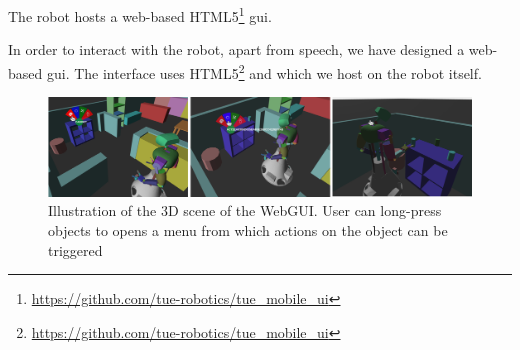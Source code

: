 \label{ssec:webgui}
The robot hosts a web-based HTML5\footnote{\url{https://github.com/tue-robotics/tue_mobile_ui}} \gls{gui}. 


In order to interact with the robot, apart from speech, we have designed a web-based \gls{gui}. The interface uses HTML5\footnote{\url{https://github.com/tue-robotics/tue_mobile_ui}} and which we host on the robot itself.

\begin{figure}[H]
	\includegraphics[width=\linewidth]{Figures/gui_actions}
	\caption{
		Illustration of the 3D scene of the WebGUI.
		User can long-press objects to opens a menu from which actions on the object can be triggered
		}
	\label{fig:gui_actions}
\end{figure}
